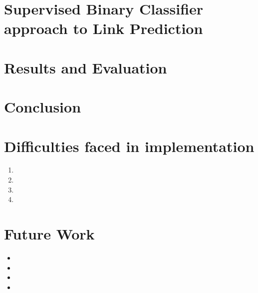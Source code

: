 \documentclass[letterpaper,twocolumn,11pt]{article}
\begin{document}
\section{Supervised Binary Classifier approach to Link Prediction}

\section{ Results and Evaluation}

\section{Conclusion}

\section{Difficulties faced in implementation}
\begin{enumerate}

\item 
\item 
\item 
\item 
\end{enumerate}


\section{Future Work}

\begin{itemize}
\item 
\item 
\item
\item 
\end{itemize}
\end{document}
